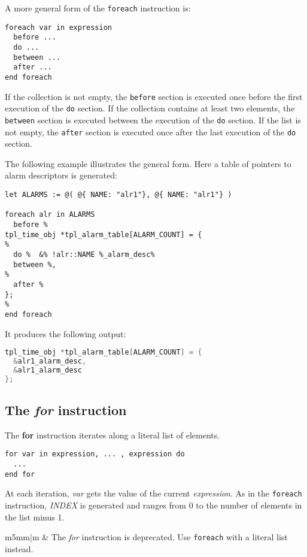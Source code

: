 \documentclass[11pt]{article}
\newcommand{\var}[1]{{\ttfamily\em #1}}
\newcommand\Warning{%
 \makebox[1.4em][c]{%
 \makebox[0pt][c]{\raisebox{.1em}{\small!}}%
 \makebox[0pt][c]{\color{red}\Large$\bigtriangleup$}}}%
\newcommand{\warning}[1]{%
\vspace{1em}
\hspace{-18.3mm}
\rowcolors{1}{white}{light-gray}
\begin{tabular}[b]{m{5mm}|m{\linewidth}}
\Warning & #1\\
\end{tabular}
}
\begin{document}
A more general form of the {\tt foreach} instruction is:

\begin{lstlisting}
foreach var in expression
  before ...
  do ...
  between ...
  after ...
end foreach
\end{lstlisting}

If the collection is not empty, the {\tt before} section is executed once before the first execution of the {\tt do} section. If the collection contains at least two elements, the {\tt between} section is executed between the execution of the {\tt do} section.  If the list is not empty, the {\tt after} section is executed once after the last execution of the {\tt do} section.

The following example illustrates the general form. Here a table of pointers to alarm descriptors is generated:

\begin{lstlisting}
let ALARMS := @( @{ NAME: "alr1"}, @{ NAME: "alr1"} )

foreach alr in ALARMS
  before %
tpl_time_obj *tpl_alarm_table[ALARM_COUNT] = {
%
  do %  &% !alr::NAME %_alarm_desc%
  between %,
%
  after %
};
%
end foreach
\end{lstlisting}

It produces the following output:

\begin{lstlisting}[language=C]
tpl_time_obj *tpl_alarm_table[ALARM_COUNT] = {
  &alr1_alarm_desc,
  &alr1_alarm_desc
};
\end{lstlisting}

\subsection{The {\em for} instruction}

The {\bf for} instruction iterates along a literal list of elements.

\begin{lstlisting}
for var in expression, ... , expression do
  ...
end for
\end{lstlisting}

At each iteration, {\em var} gets the value of the current {\em expression}. As in the {\tt foreach} instruction, \var{INDEX} is generated and ranges from 0 to the number of elements in the list minus 1.

\warning{The {\em for} instruction is deprecated. Use \texttt{foreach} with a literal list instead.}
\end{document}
